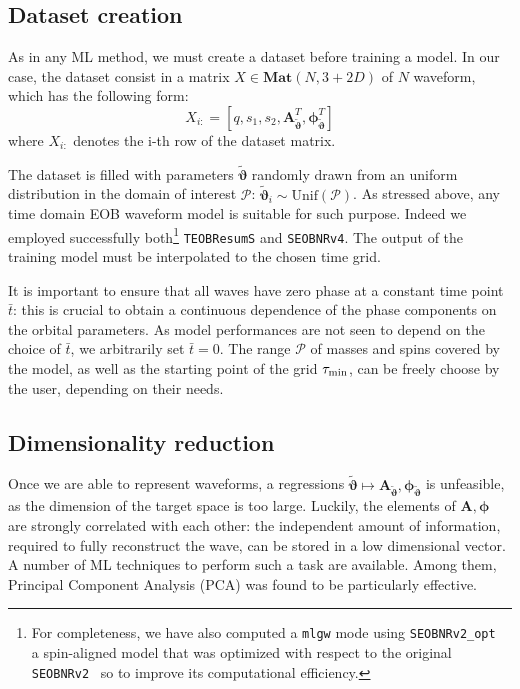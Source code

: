 \subsection{Dataset creation}
\label{sec:trainingset}
As in any ML method, we must create a dataset before training a model.
In our case, the dataset consist in a matrix ${X \in \mathbf{Mat}(N,3+2D)}$ of $N$ waveform, which has the following form:
\begin{equation} \label{eq:dataset}
	X_{i:} = [q,s_1,s_2, \boldsymbol{A}_{{\tilde{\boldsymbol{\vartheta}}}}^T, \boldsymbol{\phi}_{{\tilde{\boldsymbol{\vartheta}}}}^T]
\end{equation}
where $X_{i:}$ denotes the i-th row of the dataset matrix.

The dataset is filled with parameters ${\tilde{\boldsymbol{\vartheta}}}$ randomly drawn from an uniform distribution in the domain of interest $\mathcal{P}$: ${\tilde{\boldsymbol{\vartheta}}}_i \sim \textrm{Unif}(\mathcal{P})$.
As stressed above, any time domain EOB waveform model is suitable for such purpose. Indeed we employed 
successfully both\footnote{For completeness, we have also computed a {\tt mlgw} 
mode using \texttt{SEOBNRv2\_opt}~\cite{Devine:2016ovp}  a spin-aligned model that was optimized
with respect to the original \texttt{SEOBNRv2}~\cite{Taracchini:2013rva} 
so to improve its computational efficiency.} \texttt{TEOBResumS} and \texttt{SEOBNRv4}.
The output of the training model must be interpolated to the chosen time grid.

It is important to ensure that all waves have zero phase at a constant
time point $\bar{t}$: this is crucial to obtain a continuous
dependence of the phase components on the orbital parameters. As model
performances are not seen to depend on the choice of
$\bar{t}$, we arbitrarily set $\bar{t} = 0$.
The range $\mathcal{P}$ of masses and spins covered by the model, as 
well as the starting point of the grid $\tau_{\rm min}$, can be freely choose 
by the user, depending on their needs.


\subsection{Dimensionality reduction}
Once we are able to represent waveforms, a regressions ${\tilde{\boldsymbol{\vartheta}}} \longmapsto \boldsymbol{A}_{{\tilde{\boldsymbol{\vartheta}}}}, \boldsymbol{\phi}_{{\tilde{\boldsymbol{\vartheta}}}}$ is unfeasible, as the dimension of the target space is too large. Luckily, the elements of $\boldsymbol{A}, \boldsymbol{\phi}$ are strongly correlated with each other: the independent amount of information, required to fully reconstruct the wave, can be stored in a low dimensional vector.
A number of ML techniques to perform such a task are available. Among them, Principal Component Analysis (PCA) \cite[ch. 12]{murphy2012machine} was found to be particularly effective.

